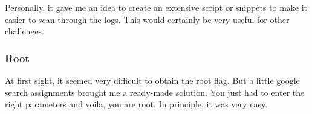 \documentclass[../main.tex]{subfiles}
\begin{document}
Personally, it gave me an idea to create an extensive script or snippets to make it easier to scan through the logs. This would certainly be very useful for other challenges.

\subsubsection{Root}
At first sight, it seemed very difficult to obtain the root flag. But a little google search assignments brought me a ready-made solution.
You just had to enter the right parameters and voila, you are root. In principle, it was very easy.
\end{document}
